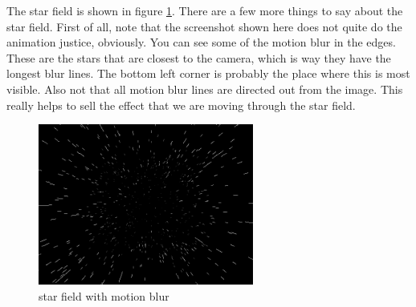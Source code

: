\documentclass[a4paper]{article}
\begin{document}
The star field is shown in figure \ref{starfield_fig}.
There are a few more things to say about the star field.
First of all, note that the screenshot shown here does not quite do the animation justice, obviously.
You can see some of the motion blur in the edges.
These are the stars that are closest to the camera, which is way they have the longest blur lines.
The bottom left corner is probably the place where this is most visible.
Also not that all motion blur lines are directed out from the image.
This really helps to sell the effect that we are moving through the star field.

\begin{figure}
\begin{center}
\includegraphics[width=200pt]{starfield.png}
\caption{star field with motion blur}
\label{starfield_fig}
\end{center}
\end{figure}
\end{document}
